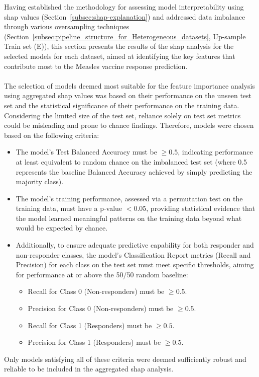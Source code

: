 \documentclass[12pt,a4paper]{report}
\begin{document}
\noindent
Having established the methodology for assessing model interpretability using \gls{shap} values (Section~\ref{subsec:shap-explanation}) and addressed data imbalance through various oversampling techniques (Section~\ref{subsec:pipeline_structure_for_Heterogeneous_datasets}, Up-sample Train set (E)), this section presents the results of the \gls{shap} analysis for the selected models for each dataset, aimed at identifying the key features that contribute most to the Measles vaccine response prediction.\\
\\
The selection of models deemed most suitable for the feature importance analysis using aggregated \gls{shap} values was based on their performance on the unseen test set and the statistical significance of their performance on the training data. Considering the limited size of the test set, reliance solely on test set metrics could be misleading and prone to chance findings. Therefore, models were chosen based on the following criteria:
\begin{itemize}
    \item The model's Test Balanced Accuracy must be $\geq 0.5$, indicating performance at least equivalent to random chance on the imbalanced test set (where 0.5 represents the baseline Balanced Accuracy achieved by simply predicting the majority class).
    \item The model's training performance, assessed via a permutation test on the training data, must have a p-value $< 0.05$, providing statistical evidence that the model learned meaningful patterns on the training data beyond what would be expected by chance.
    \item Additionally, to ensure adequate predictive capability for both responder and non-responder classes, the model's Classification Report metrics (Recall and Precision) for each class on the test set must meet specific thresholds, aiming for performance at or above the 50/50 random baseline:
    \begin{itemize}
        \item Recall for Class 0 (Non-responders) must be $\geq 0.5$.
        \item Precision for Class 0 (Non-responders) must be $\geq 0.5$.
        \item Recall for Class 1 (Responders) must be $\geq 0.5$.
        \item Precision for Class 1 (Responders) must be $\geq 0.5$.
    \end{itemize}
\end{itemize}
Only models satisfying all of these criteria were deemed sufficiently robust and reliable to be included in the aggregated \gls{shap} analysis.
\end{document}
